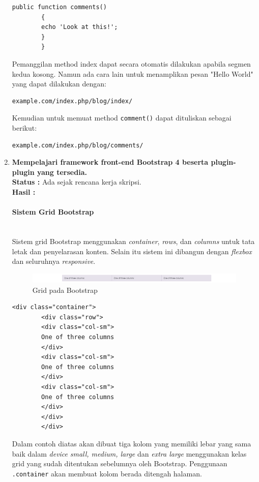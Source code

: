 \documentclass[a4paper,twoside]{article}
\newcommand{\myparagraph}[1]{\paragraph{#1}\mbox{}\\}
\begin{document}
\begin{enumerate}
\begin{lstlisting}[frame=single]
		public function comments()
		{
		echo 'Look at this!';
		}
		}
		\end{lstlisting}
		
		\noindent Pemanggilan method index dapat secara otomatis dilakukan apabila segmen kedua kosong. Namun ada cara lain untuk menamplikan pesan "Hello World" yang dapat dilakukan dengan:
		
		\begin{lstlisting}[frame=single] 
		example.com/index.php/blog/index/
		\end{lstlisting}
		
		\noindent Kemudian untuk memuat method \texttt{comment()} dapat dituliskan sebagai berikut:
		\begin{lstlisting}[frame=single] 
		example.com/index.php/blog/comments/
		\end{lstlisting}
		
		\item \textbf{Mempelajari framework front-end Bootstrap 4 beserta plugin-plugin yang tersedia.}\\
		{\bf Status :} Ada sejak rencana kerja skripsi.\\
		{\bf Hasil :} 
		
		\myparagraph{Sistem Grid Bootstrap}
		Sistem grid Bootstrap menggunakan \textit{container}, \textit{rows}, dan \textit{columns} untuk tata letak dan penyelarasan konten. Selain itu sistem ini dibangun dengan \textit{flexbox} dan seluruhnya \textit{responsive}. \cite{bootstrap:19}
		\begin{figure} [H]
			\centering  
			\includegraphics[scale=0.7]{gridbasic_bootstrap.png}  
			\caption{Grid pada Bootstrap} 
		\end{figure}
		
		\begin{lstlisting}[frame=single] 
		<div class="container">
		<div class="row">
		<div class="col-sm">
		One of three columns
		</div>
		<div class="col-sm">
		One of three columns
		</div>
		<div class="col-sm">
		One of three columns
		</div>
		</div>
		</div>
		\end{lstlisting}
		Dalam contoh diatas akan dibuat tiga kolom yang memiliki lebar yang sama baik dalam \textit{device} \textit{small, medium, large} dan \textit{extra large} menggunakan kelas grid yang sudah ditentukan sebelumnya oleh Bootstrap. Penggunaan \verb|.container| akan membuat kolom berada ditengah halaman.
		

\end{enumerate}
\end{document}
